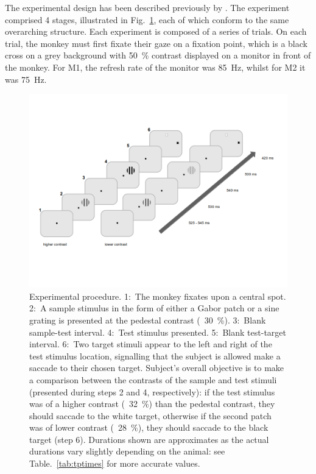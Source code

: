 The experimental design has been described previously by \cite{Chen2013,Chen2014}.
The experiment comprised 4 stages, illustrated in Fig.~\ref{fig:pltask1}, each of which conform to the same overarching structure.
Each experiment is composed of a series of trials.
On each trial, the monkey must first fixate their gaze on a fixation point, which is a black cross on a grey background with \SI{50}{\percent} contrast displayed on a monitor in front of the monkey.
For \ac{M1}, the refresh rate of the monitor was \SI{85}{Hz}, whilst for \ac{M2} it was \SI{75}{Hz}.

\begin{figure}[htbp]
\begin{center}
\includegraphics[width=\linewidth]{./figs/info/PLtask1.png}
\end{center}
\caption{
Experimental procedure.
1:~The monkey fixates upon a central spot.
2:~A sample stimulus in the form of either a Gabor patch or a sine grating is presented at the pedestal contrast (\eg{}~\SI{30}{\percent}).
3:~Blank sample-test interval.
4:~Test stimulus presented.
5:~Blank test-target interval.
6:~Two target stimuli appear to the left and right of the test stimulus location, signalling that the subject is allowed make a saccade to their chosen target.
Subject's overall objective is to make a comparison between the contrasts of the sample and test stimuli (presented during steps 2 and 4, respectively): if the test stimulus was of a higher contrast (\eg{}~\SI{32}{\percent}) than the pedestal contrast, they should saccade to the white target, otherwise if the second patch was of lower contrast (\eg{}~\SI{28}{\percent}), they should saccade to the black target (step 6).
Durations shown are approximates as the actual durations vary slightly depending on the animal: see Table.~\ref{tab:tptimes} for more accurate values.}
\label{fig:pltask1}
\end{figure}

